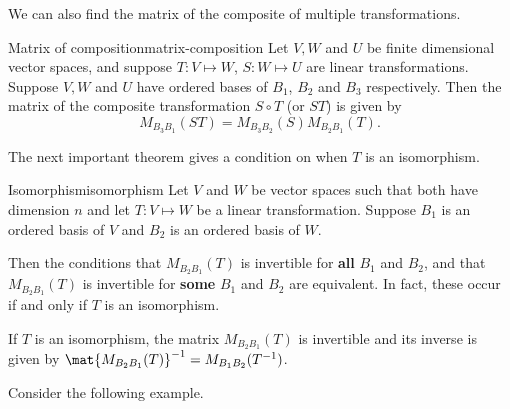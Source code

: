We can also find the matrix of the composite of multiple transformations.

\begin{theorem}{Matrix of composition}{matrix-composition}
Let $V,W$ and $U$ be finite dimensional vector spaces, and suppose $T : V \mapsto W$, $S: W \mapsto U$ are linear transformations. 
Suppose $V, W$ and $U$ have ordered bases of $B_1$, $B_2$ and $B_3$ respectively.  Then the matrix of the composite transformation $S \circ T$ (or $ST$) is given by 
\[ M_{B_3B_1}(ST)=M_{B_3B_2}(S) M_{B_2B_1}(T).\]
\end{theorem}

The next important theorem gives a condition on when $T$ is an isomorphism.

\begin{theorem}{Isomorphism}{isomorphism}
Let $V$ and $W$ be vector spaces such that both have dimension $n$ and let $T: V \mapsto W$ be a linear transformation. Suppose $B_1$ is an ordered basis of $V$ and $B_2$ is an ordered basis of $W$. 

 Then the conditions that $M_{B_2B_1}(T)$ is invertible for \textbf{all} $B_1$ and $B_2$, and that $M_{B_2B_1}(T)$ is invertible for \textbf{some} $B_1$ and $B_2$ are equivalent. In fact, these occur if and only if $T$ is an isomorphism. 

If $T$ is an isomorphism, the matrix $M_{B_2B_1}(T)$ is invertible and its inverse is given by $\mat{M_{B_2B_1}(T) } ^{-1} = M_{B_1B_2}(T^{-1})$.
\end{theorem}

Consider the following example.

